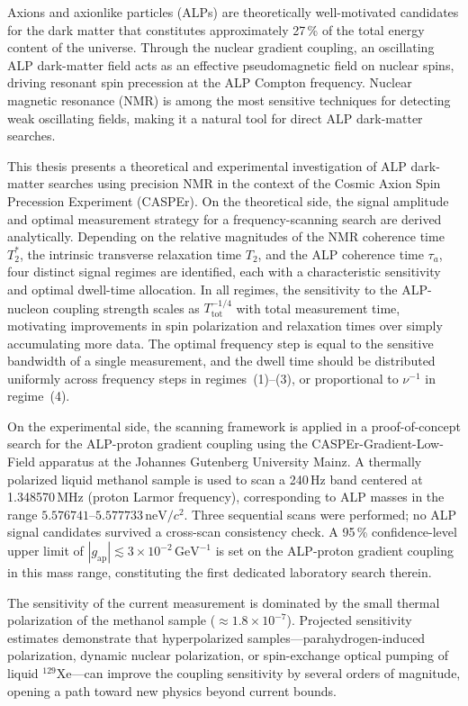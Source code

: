 
Axions and axionlike particles (ALPs) are theoretically well-motivated candidates for the dark matter that constitutes approximately 27\,\% of the total energy content of the universe. Through the nuclear gradient coupling, an oscillating ALP dark-matter field acts as an effective pseudomagnetic field on nuclear spins, driving resonant spin precession at the ALP Compton frequency. Nuclear magnetic resonance (NMR) is among the most sensitive techniques for detecting weak oscillating fields, making it a natural tool for direct ALP dark-matter searches.

This thesis presents a theoretical and experimental investigation of ALP dark-matter searches using precision NMR in the context of the Cosmic Axion Spin Precession Experiment (CASPEr). On the theoretical side, the signal amplitude and optimal measurement strategy for a frequency-scanning search are derived analytically. Depending on the relative magnitudes of the NMR coherence time $T_2^*$, the intrinsic transverse relaxation time $T_2$, and the ALP coherence time $\tau_a$, four distinct signal regimes are identified, each with a characteristic sensitivity and optimal dwell-time allocation. In all regimes, the sensitivity to the ALP-nucleon coupling strength scales as $T_\mathrm{tot}^{-1/4}$ with total measurement time, motivating improvements in spin polarization and relaxation times over simply accumulating more data. The optimal frequency step is equal to the sensitive bandwidth of a single measurement, and the dwell time should be distributed uniformly across frequency steps in regimes~(1)--(3), or proportional to $\nu^{-1}$ in regime~(4).

On the experimental side, the scanning framework is applied in a proof-of-concept search for the ALP-proton gradient coupling using the CASPEr-Gradient-Low-Field apparatus at the Johannes Gutenberg University Mainz. A thermally polarized liquid methanol sample is used to scan a 240\,Hz band centered at 1.348570\,MHz (proton Larmor frequency), corresponding to ALP masses in the range $5.576741$--$5.577733\,\mathrm{neV}/c^2$. Three sequential scans were performed; no ALP signal candidates survived a cross-scan consistency check. A 95\,\% confidence-level upper limit of $|g_\mathrm{ap}| \lesssim 3\times10^{-2}\,\mathrm{GeV}^{-1}$ is set on the ALP-proton gradient coupling in this mass range, constituting the first dedicated laboratory search therein.

The sensitivity of the current measurement is dominated by the small thermal polarization of the methanol sample ($\approx 1.8\times10^{-7}$). Projected sensitivity estimates demonstrate that hyperpolarized samples---parahydrogen-induced polarization, dynamic nuclear polarization, or spin-exchange optical pumping of liquid ${}^{129}$Xe---can improve the coupling sensitivity by several orders of magnitude, opening a path toward new physics beyond current bounds.
